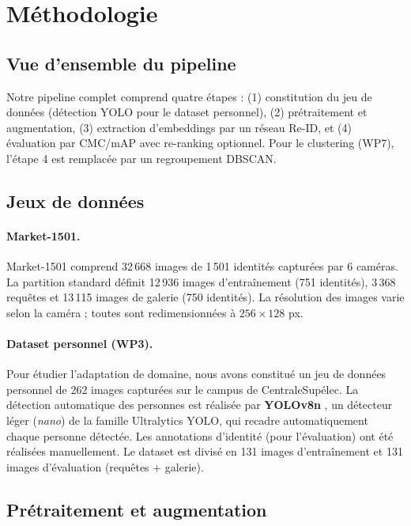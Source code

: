 \section{Méthodologie}
\label{sec:methodology}

\subsection{Vue d'ensemble du pipeline}

Notre pipeline complet comprend quatre étapes : (1) constitution du jeu de données (détection YOLO pour le dataset personnel), (2) prétraitement et augmentation, (3) extraction d'embeddings par un réseau Re-ID, et (4) évaluation par CMC/mAP avec re-ranking optionnel. Pour le clustering (WP7), l'étape 4 est remplacée par un regroupement DBSCAN.

\subsection{Jeux de données}

\paragraph{Market-1501.}
Market-1501 \cite{zheng2015scalable} comprend 32\,668 images de 1\,501 identités capturées par 6 caméras. La partition standard définit 12\,936 images d'entraînement (751 identités), 3\,368 requêtes et 13\,115 images de galerie (750 identités). La résolution des images varie selon la caméra ; toutes sont redimensionnées à $256 \times 128$ px.

\paragraph{Dataset personnel (WP3).}
Pour étudier l'adaptation de domaine, nous avons constitué un jeu de données personnel de 262 images capturées sur le campus de CentraleSupélec. La détection automatique des personnes est réalisée par \textbf{YOLOv8n} \cite{ultralytics2023}, un détecteur léger (\textit{nano}) de la famille Ultralytics YOLO, qui recadre automatiquement chaque personne détectée. Les annotations d'identité (pour l'évaluation) ont été réalisées manuellement. Le dataset est divisé en 131 images d'entraînement et 131 images d'évaluation (requêtes + galerie).

\subsection{Prétraitement et augmentation}

